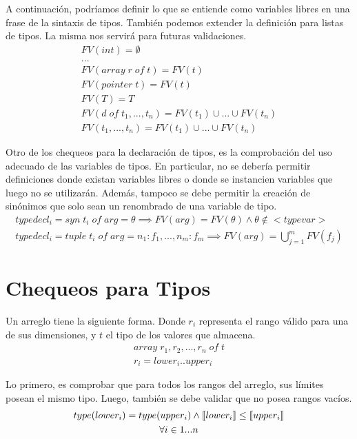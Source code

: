 \documentclass{article}
\begin{document}
A continuación, podríamos definir lo que se entiende como variables libres en una frase de la sintaxis de tipos.
También podemos extender la definición para listas de tipos.
La misma nos servirá para futuras validaciones.
\begin{gather*}
FV(int) = \emptyset \\
... \\
FV(array \; r \; of \; t) = FV(t) \\
FV(pointer \; t) = FV(t) \\
FV(T) = T \\
FV(d \; of \; t_1, ..., t_n) = FV(t_1) \cup ... \cup FV(t_n) \\
FV(t_1, ..., t_n) = FV(t_1) \cup ... \cup FV(t_n)
\end{gather*}

Otro de los chequeos para la declaración de tipos, es la comprobación del uso adecuado de las variables de tipos.
En particular, no se debería permitir definiciones donde existan variables libres o donde se instancien variables que luego no se utilizarán.
Además, tampoco se debe permitir la creación de sinónimos que solo sean un renombrado de una variable de tipo.
\begin{gather*}
typedecl_i = syn \; t_i \; of \; arg = \theta \implies
FV(arg) = FV(\theta) \wedge \theta \notin < \! typevar \! >
\\
typedecl_i = tuple \; t_i \; of \; arg = n_1: f_1, ..., n_m: f_m
\implies FV(arg) = \bigcup_{j = 1}^{m} FV(f_j)
\end{gather*}

\section{Chequeos para Tipos}

Un arreglo tiene la siguiente forma.
Donde $r_i$ representa el rango válido para una de sus dimensiones, y $t$ el tipo de los valores que almacena.
\begin{gather*}
array \; r_1, r_2, ..., r_n \; of \; t \\
r_i = lower_i .. upper_i
\end{gather*}

Lo primero, es comprobar que para todos los rangos del arreglo, sus límites posean el mismo tipo.
Luego, también se debe validar que no posea rangos vacíos.
\begin{gather*}
type(lower_i) = type(upper_i)
\wedge
[\![ lower_i ]\!] \leq [\![ upper_i ]\!] \\
\forall i \in {1...n}
\end{gather*}
\end{document}
